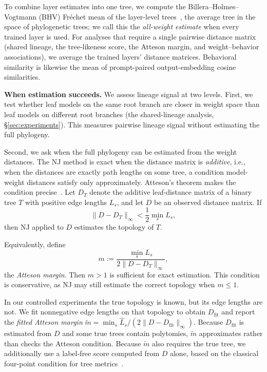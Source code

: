 \documentclass{article}
\theoremstyle{definition}
\theoremstyle{plain}
\begin{document}
To combine layer estimates into one tree, we compute the Billera--Holmes--Vogtmann (BHV)
Fr\'echet mean of the layer-level trees~\citep{billera2001geometry, willis2019confidence}, the average tree in the space of phylogenetic trees; we call this the \emph{all-weight estimate} when every trained layer is used. For analyses that require a single pairwise distance matrix (shared lineage, the tree-likeness score, the Atteson margin,
and weight--behavior associations), we average the trained layers' distance
matrices. Behavioral similarity is likewise the mean of prompt-paired output-embedding
cosine similarities.



\textbf{When estimation succeeds.}\label{sec:framework:theory}
We assess lineage signal at two levels. First, we test whether leaf models on the same root branch are closer in weight space than leaf models on different root branches (the shared-lineage analysis, \S\ref{sec:experiments}). This measures pairwise lineage signal without estimating the full phylogeny.

Second, we ask when the full phylogeny can be estimated from the weight distances. The NJ method is exact when the distance matrix is
\emph{additive}, i.e., when the distances are exactly path lengths on some tree, a condition model-weight distances satisfy only approximately. Atteson's theorem makes the
condition precise~\citep{atteson1999performance}. Let $D_T$ denote the additive leaf-distance matrix of a binary tree $T$ with positive edge lengths ${L_s}$, and let $D$ be an observed distance matrix. If
$$
\lVert D-D_T\rVert_\infty < \frac{1}{2}\min_s L_s,
$$
then NJ applied to $D$ estimates the topology of $T$.

Equivalently, define
$$
m:=\frac{\min_s L_s}{2\lVert D-D_T\rVert_\infty},
$$
the \emph{Atteson margin}. Then $m>1$ is sufficient for exact estimation. This condition is conservative, as NJ may still estimate the correct topology when $m\leq1$.

In our controlled experiments the true topology is
known, but its edge lengths are not. We fit nonnegative edge lengths on that topology to obtain
$D_{\mathrm{fit}}$ and report the \emph{fitted Atteson margin}
$\widetilde m=\min_s\widehat L_s/(2\lVert D-D_{\mathrm{fit}}\rVert_\infty)$. Because
$D_{\mathrm{fit}}$ is estimated from $D$ and some true trees contain polytomies, $\widetilde m$ approximates rather than checks the Atteson condition. Because $\widetilde m$ also requires the true tree, we additionally
use a label-free score computed from $D$ alone, based on the classical four-point condition for tree
metrics~\citep{sempleSteel2003phylogenetics}.
\end{document}

